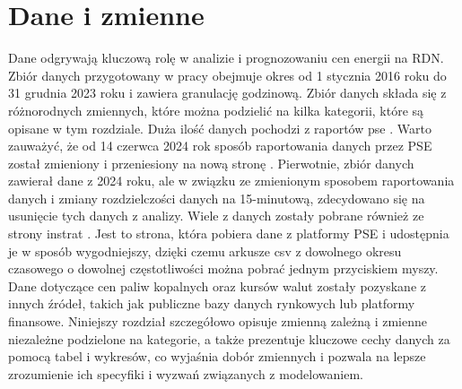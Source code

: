 \chapter{Dane i zmienne}
\label{ch:dane}

Dane odgrywają kluczową rolę w analizie i prognozowaniu cen energii na RDN. Zbiór danych przygotowany w pracy obejmuje okres od 1 stycznia 2016 roku do 31 grudnia 2023 roku i zawiera granulację godzinową. Zbiór danych składa się z różnorodnych zmiennych, które można podzielić na kilka kategorii, które są opisane w tym rozdziale. Duża ilość danych pochodzi z raportów \gls{pse} \cite{PSEOLD}. Warto zauważyć, że od 14 czerwca 2024 rok sposób raportowania danych przez PSE został zmieniony i przeniesiony na nową stronę \cite{PSENEW}. Pierwotnie, zbiór danych zawierał dane z 2024 roku, ale w związku ze zmienionym sposobem raportowania danych i zmiany rozdzielczości danych na 15-minutową, zdecydowano się na usunięcie tych danych z analizy. Wiele z danych zostały pobrane również ze strony instrat \cite{INSTRAT_ENERGY}. Jest to strona, która pobiera dane z platformy PSE i udostępnia je w sposób wygodniejszy, dzięki czemu arkusze csv z dowolnego okresu czasowego o dowolnej częstotliwości można pobrać jednym przyciskiem myszy. Dane dotyczące cen paliw kopalnych oraz kursów walut zostały pozyskane z innych źródeł, takich jak publiczne bazy danych rynkowych lub platformy finansowe. Niniejszy rozdział szczegółowo opisuje zmienną zależną i zmienne niezależne podzielone na kategorie, a także prezentuje kluczowe cechy danych za pomocą tabel i wykresów, co wyjaśnia dobór zmiennych i pozwala na lepsze zrozumienie ich specyfiki i wyzwań związanych z modelowaniem.

